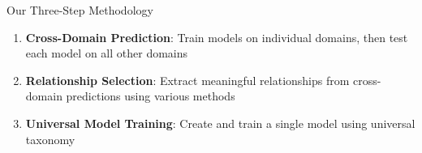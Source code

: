 \documentclass[aspectratio=169]{beamer}
\begin{document}
\begin{frame}{Our Three-Step Methodology}
    \begin{center}
    \end{center}

    \vspace{1em}

    \begin{enumerate}
        \item \textbf{Cross-Domain Prediction}: Train models on individual domains, then test each model on all other domains
        \item \textbf{Relationship Selection}: Extract meaningful relationships from cross-domain predictions using various methods
        \item \textbf{Universal Model Training}: Create and train a single model using universal taxonomy
    \end{enumerate}
\end{frame}
\end{document}
